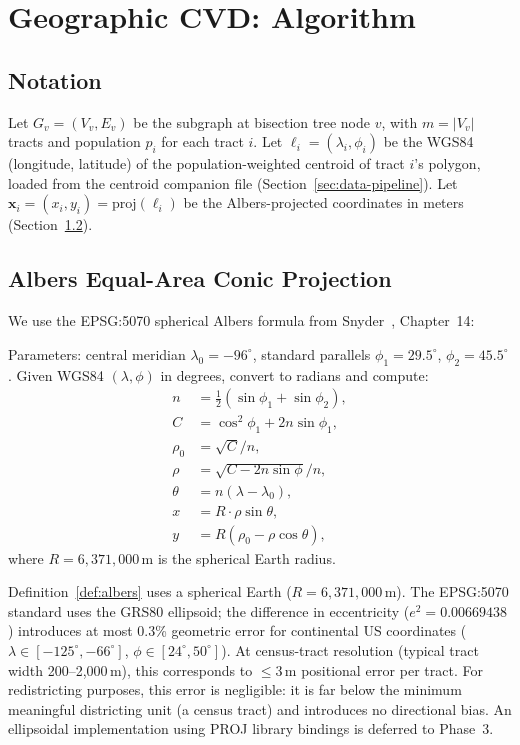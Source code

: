\section{Geographic CVD: Algorithm}
\label{sec:algorithm}

\subsection{Notation}

Let $G_v = (V_v, E_v)$ be the subgraph at bisection tree node $v$, with
$m = |V_v|$ tracts and population $p_i$ for each tract $i$.
Let $\ell_i = (\lambda_i, \phi_i)$ be the WGS84 (longitude, latitude) of the
population-weighted centroid of tract $i$'s polygon, loaded from the centroid
companion file (Section~\ref{sec:data-pipeline}).
Let $\mathbf{x}_i = (x_i, y_i) = \mathrm{proj}(\ell_i)$ be the Albers-projected
coordinates in meters (Section~\ref{subsec:albers}).

\subsection{Albers Equal-Area Conic Projection}
\label{subsec:albers}

We use the EPSG:5070 spherical Albers formula from Snyder~\citeyear{snyder1987},
Chapter~14:

\begin{definition}
\label{def:albers}
Parameters: central meridian $\lambda_0 = -96^{\circ}$,
standard parallels $\phi_1 = 29.5^{\circ}$, $\phi_2 = 45.5^{\circ}$.
Given WGS84 $(\lambda, \phi)$ in degrees, convert to radians and compute:
\begin{align}
  n     &= \tfrac{1}{2}(\sin\phi_1 + \sin\phi_2), \\
  C     &= \cos^2\!\phi_1 + 2n\sin\phi_1, \\
  \rho_0 &= \sqrt{C} / n, \\
  \rho  &= \sqrt{C - 2n\sin\phi} / n, \\
  \theta &= n(\lambda - \lambda_0), \\
  x     &= R \cdot \rho\sin\theta, \\
  y     &= R(\rho_0 - \rho\cos\theta),
\end{align}
where $R = 6{,}371{,}000$\,m is the spherical Earth radius.
\end{definition}

\begin{remark}
Definition~\ref{def:albers} uses a spherical Earth ($R = 6{,}371{,}000$\,m).
The EPSG:5070 standard uses the GRS80 ellipsoid; the difference in
eccentricity ($e^2 = 0.00669438$) introduces at most 0.3\% geometric
error for continental US coordinates ($\lambda \in [-125^{\circ}, -66^{\circ}]$,
$\phi \in [24^{\circ}, 50^{\circ}]$).
At census-tract resolution (typical tract width 200--2{,}000\,m), this corresponds
to $\le 3$\,m positional error per tract.
For redistricting purposes, this error is negligible: it is far below the
minimum meaningful districting unit (a census tract) and introduces no
directional bias.
An ellipsoidal implementation using PROJ library bindings is deferred to
Phase~3.
\end{remark}

